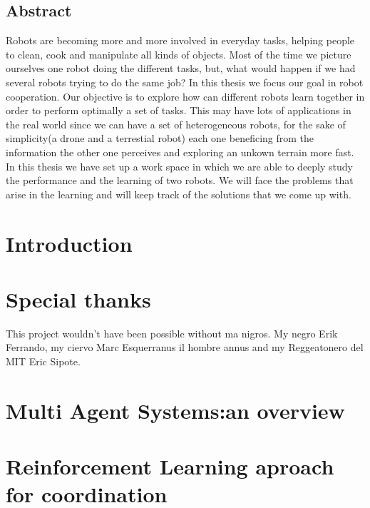 \documentclass{article}
\begin{document}
\begin{center}
\section{Abstract}

\end{center}

Robots are becoming more and more involved in everyday tasks, helping people to clean, cook and manipulate all kinds of objects. Most of the time we picture ourselves one robot doing the different tasks, but, what would happen if we had several robots trying to do the same job?\newline\newline
In this thesis we focus our goal in robot cooperation. Our objective is to explore how can different robots learn together in order to perform optimally a set of tasks. This may have lots of applications in the real world since we can have a set of heterogeneous robots, for the sake of simplicity(a drone and a terrestial robot) each one beneficing from the information the other one perceives and exploring an unkown terrain more fast.
\newline \newline
In this thesis we have set up a work space in which we are  able to deeply study the performance and the learning of two robots. We will face the problems that arise in the learning and will keep track of the solutions that we come up with.

\newpage

\tableofcontents
\maketitle

\section{Introduction}
\section{Special thanks}
This project wouldn't have been possible without ma nigros. My negro Erik Ferrando, my ciervo Marc Esquerranus il hombre annus and my Reggeatonero del MIT Eric Sipote.
\section{Multi Agent Systems:an overview}
\section{Reinforcement Learning aproach for 
coordination}
\end{document}

